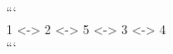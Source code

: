 \documentclass[preview]{standalone}
\begin{document}
```\\1 <-> 2 <-> 5 <-> 3 <-> 4\\```\\
\end{document}
